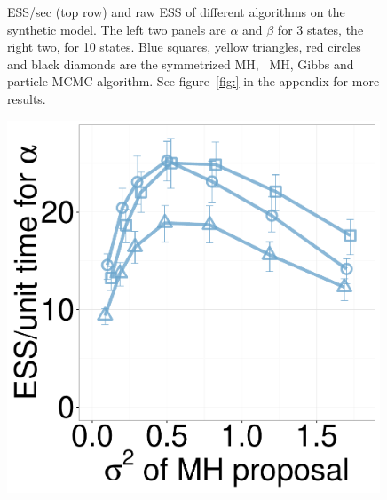 \begin{figure}[H]
\begin{minipage}[hp]{0.24\linewidth}
	\end{minipage}
    \caption{ESS/sec (top row) and raw ESS of different algorithms on the synthetic  model. The left two panels are $\alpha$ and $\beta$ for 3 states, the right two, for 10 states. Blue squares, yellow triangles, red circles and black diamonds are the symmetrized MH, \naive\ MH, Gibbs and particle MCMC algorithm. See figure~\ref{fig:} in the appendix for more results.}
     \label{fig:ESS_EXP_D10}
  \end{figure}


  \begin{figure}[H]
  \centering
  \begin{minipage}[!hp]{0.24\linewidth}
  \centering
    \includegraphics [width=0.99\textwidth, angle=0]{figs/new_whole_exp_figs/mh_exp_alpha_dim3.pdf}
\end{minipage}
  \begin{minipage}[hp]{0.24\linewidth}
  \centering

\end{minipage}
\end{figure}
